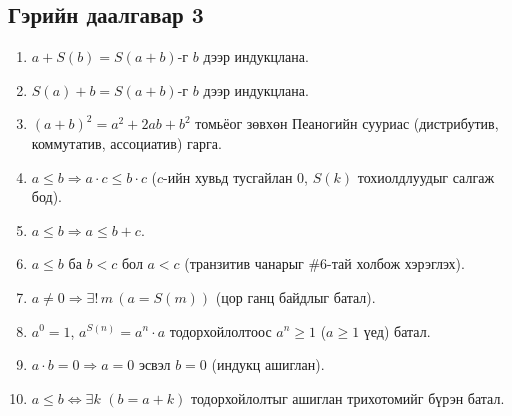 \subsection*{Гэрийн даалгавар 3}
\begin{enumerate}
  \item $a+S(b)=S(a+b)$-г $b$ дээр индукцлана.
  \item $S(a)+b=S(a+b)$-г $b$ дээр индукцлана.
  \item $(a+b)^2=a^2+2ab+b^2$ томьёог зөвхөн Пеаногийн сууриас (дистрибутив, коммутатив, ассоциатив) гарга.
  \item $a\le b\Rightarrow a\cdot c\le b\cdot c$ ($c$-ийн хувьд тусгайлан $0$, $S(k)$ тохиолдлуудыг салгаж бод).
  \item $a\le b\Rightarrow a\le b+ c$.
  \item $a\le b$ ба $b<c$ бол $a<c$ (транзитив чанарыг \#6-тай холбож хэрэглэх).
  \item $a\ne 0\Rightarrow \exists!\,m\,(a=S(m))$ (цор ганц байдлыг батал).
  \item $a^0=1$, $a^{S(n)}=a^n\cdot a$ тодорхойлолтоос $a^{n}\ge 1$ ($a\ge 1$ үед) батал.
  \item $a\cdot b=0\Rightarrow a=0$ эсвэл $b=0$ (индукц ашиглан).
  \item $a\le b\iff \exists k\,\,(b=a+k)$ тодорхойлолтыг ашиглан трихотомийг бүрэн батал.
\end{enumerate}

